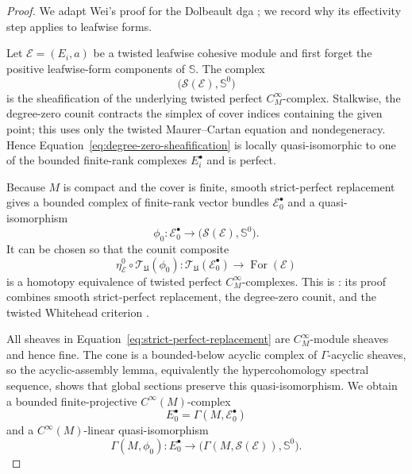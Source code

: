 \documentclass[12pt]{amsart}
\theoremstyle{definition}
\theoremstyle{remark}
\numberwithin{equation}{section}
\newcommand{\1}{{\mathbb{1}}}
\begin{document}
\begin{proof}
We adapt Wei's proof for the Dolbeault dga
\cite[Theorem 1.1]{Wei23}; we record why its effectivity step applies
to leafwise forms.

Let $\mathcal E=(E_i,a)$ be a twisted leafwise cohesive module and
first forget the positive leafwise-form components of $\mathbb S$.
The complex
\begin{equation}
 \bigl(\mathcal S(\mathcal E),\mathbb S^0\bigr)
 \label{eq:degree-zero-sheafification}
\end{equation}
is the sheafification of the underlying twisted perfect
$C^\infty_M$-complex.  Stalkwise, the degree-zero counit contracts the
simplex of cover indices containing the given point; this uses only
the twisted Maurer--Cartan equation and nondegeneracy.  Hence
Equation~\eqref{eq:degree-zero-sheafification} is locally
quasi-isomorphic to one of the bounded finite-rank complexes
$E_i^\bullet$ and is perfect.

Because $M$ is compact and the cover is finite, smooth
strict-perfect replacement gives a bounded complex of finite-rank
vector bundles $\mathcal E_0^\bullet$ and a quasi-isomorphism
\begin{equation}
 \phi_0:\mathcal E_0^\bullet
 \longrightarrow
 \bigl(\mathcal S(\mathcal E),\mathbb S^0\bigr).
 \label{eq:strict-perfect-replacement}
\end{equation}
It can be chosen so that the counit composite
\begin{equation}\label{eq:degree-zero-counit-equivalence}
 \eta^0_{\mathcal E}\circ
 \mathcal T_{\mathfrak U}(\phi_0):
 \mathcal T_{\mathfrak U}(\mathcal E_0^\bullet)
 \longrightarrow
 \operatorname{For}(\mathcal E)
\end{equation}
is a homotopy equivalence of twisted perfect
$C^\infty_M$-complexes.  This is
\cite[Proposition 4.3]{Wei23}: its proof combines smooth
strict-perfect replacement, the degree-zero counit, and the twisted
Whitehead criterion \cite[Proposition 3.3]{Wei23}.

All sheaves in Equation~\eqref{eq:strict-perfect-replacement} are
$C^\infty_M$-module sheaves and hence fine.  The cone is a bounded-below
acyclic complex of $\Gamma$-acyclic sheaves, so the acyclic-assembly
lemma, equivalently the hypercohomology spectral sequence, shows that
global sections preserve this quasi-isomorphism.  We obtain a bounded
finite-projective $C^\infty(M)$-complex
\[
 E_0^\bullet=\Gamma(M,\mathcal E_0^\bullet)
\]
and a $C^\infty(M)$-linear quasi-isomorphism
\begin{equation}
 \Gamma(M,\phi_0):E_0^\bullet
 \longrightarrow
 \bigl(\Gamma(M,\mathcal S(\mathcal E)),\mathbb S^0\bigr).
 \label{eq:global-degree-zero-model}
\end{equation}


\end{proof}
\end{document}
